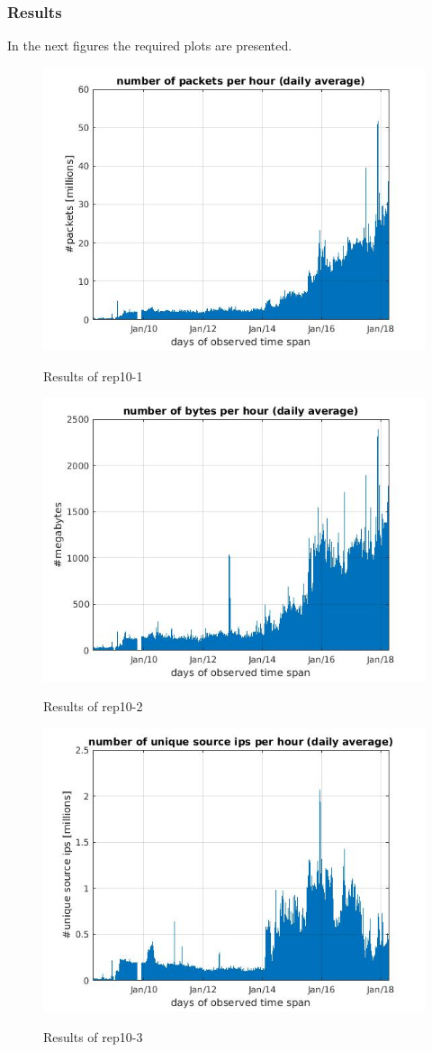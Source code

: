 \subsubsection*{Results}
In the next figures the required plots are presented.
\begin{figure}[H]
\center
\includegraphics[width=.7\textwidth]{./chapters/plots/rep10_1.jpg}\\
\caption{Results of rep10-1}
\end{figure}
\begin{figure}[H]

\center
\includegraphics[width=.7\textwidth]{./chapters/plots/rep10_2.jpg}\\
\caption{Results of rep10-2}
\end{figure}

\begin{figure}[H]
\center
\includegraphics[width=.7\textwidth]{./chapters/plots/rep10_3.jpg}\\
\caption{Results of rep10-3}
\end{figure}

